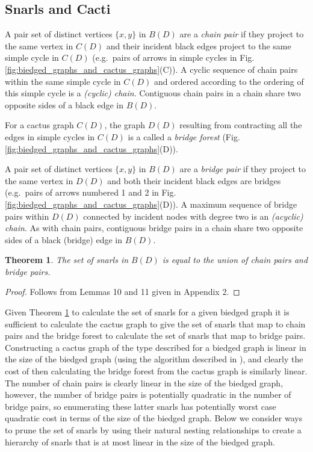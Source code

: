 \documentclass[11pt]{ucthesis}
\newtheorem{theorem}{Theorem}
\newtheorem*{proof}{Proof}
\begin{document}
\subsection{Snarls and Cacti}

A pair set of distinct vertices $\{ x, y \}$ in $B(D)$ are a \emph{chain pair} if they project to the same vertex in $C(D)$ and their incident black edges project to the same simple cycle in $C(D)$ (e.g.\ pairs of arrows in simple cycles  in Fig. \ref{fig:biedged_graphs_and_cactus_graphs}(C)). A cyclic sequence of chain pairs within the same simple cycle in $C(D)$ and ordered according to the ordering of this simple cycle is a \emph{(cyclic) chain}. Contiguous chain pairs in a chain share two opposite sides of a black edge in $B(D)$.

For a cactus graph $C(D)$, the graph $D(D)$ resulting from contracting all the edges in simple cycles in $C(D)$ is a called a \emph{bridge forest} (Fig. \ref{fig:biedged_graphs_and_cactus_graphs}(D)).

A pair set of distinct vertices $\{ x, y \}$ in $B(D)$ are a \emph{bridge pair} if they project to the same vertex in $D(D)$  and both their incident black edges are bridges (e.g.\ pairs of arrows numbered 1 and 2 in Fig. \ref{fig:biedged_graphs_and_cactus_graphs}(D)). A maximum sequence of bridge pairs within $D(D)$ connected by incident nodes with degree two is an \emph{(acyclic) chain}. As with chain pairs, contiguous bridge pairs in a chain share two opposite sides of a black (bridge) edge in $B(D)$.


\begin{theorem}
The set of snarls in $B(D)$ is equal to the union of chain pairs and bridge pairs.
\label{theorem_chain_and_bridge_pair_bijection_complex_bubbles}
\end{theorem}
\begin{proof}
Follows from Lemmas 10 and 11 given in Appendix 2.
\end{proof}

Given Theorem \ref{theorem_chain_and_bridge_pair_bijection_complex_bubbles} to calculate the set of snarls for a given biedged graph it is sufficient to calculate the cactus graph to give the set of snarls that map to chain pairs and the bridge forest to calculate the set of snarls that map to bridge pairs. Constructing a cactus graph of the type described for a biedged graph is linear in the size of the biedged graph (using the algorithm described in \cite{Paten:2011fv}), and clearly the cost of then calculating the bridge forest from the cactus graph is similarly linear. The number of chain pairs is clearly linear in the size of the biedged graph, however, the number of bridge pairs is potentially quadratic in the number of bridge pairs, so enumerating these latter snarls has potentially worst case quadratic cost in terms of the size of the biedged graph. Below we consider ways to prune the set of snarls by using their natural nesting relationships to create a hierarchy of snarls that is at most linear in the size of the biedged graph. 
\end{document}

